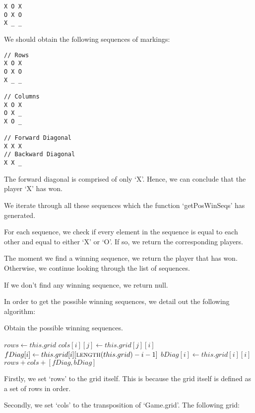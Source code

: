 \documentclass{article}
\begin{document}
\begin{verbatim}
X O X
O X O
X _ _
\end{verbatim}

We should obtain the following sequences of markings:

\begin{verbatim}
// Rows
X O X
O X O
X _ _

// Columns
X O X
O X _
X O _

// Forward Diagonal
X X X
// Backward Diagonal
X X _
\end{verbatim}

The forward diagonal is comprised of only `X'. Hence, we can conclude that the player `X' has won.

We iterate through all these sequences which the function `getPosWinSeqs' has generated.

For each sequence, we check if every element in the sequence is equal to each other and equal to either `X' or `O'. If so, we return the corresponding players.

The moment we find a winning sequence, we return the player that has won. Otherwise, we continue looking through the list of sequences.

If we don't find any winning sequence, we return null.

In order to get the possible winning sequences, we detail out the following algorithm:

\begin{algorithm}
\caption{Obtain the possible winning sequences.}

\begin{algorithmic}[1]
  \State $rows \gets this.grid$
      \State $cols[i][j] \gets this.grid[j][i]$
    \EndFor
  \EndFor
    \State $fDiag[i] \gets this.grid[i][\Call{length}{this.grid} - i - 1]$
  \EndFor
    \State $bDiag[i] \gets this.grid[i][i]$
  \EndFor
  \Return $rows + cols + [fDiag, bDiag]$
\EndProcedure
\end{algorithmic}
\end{algorithm}

Firstly, we set `rows' to the grid itself. This is because the grid itself is defined as a set of rows in order.

Secondly, we set `cols' to the transposition of `Game.grid'. The following grid:
\end{document}
